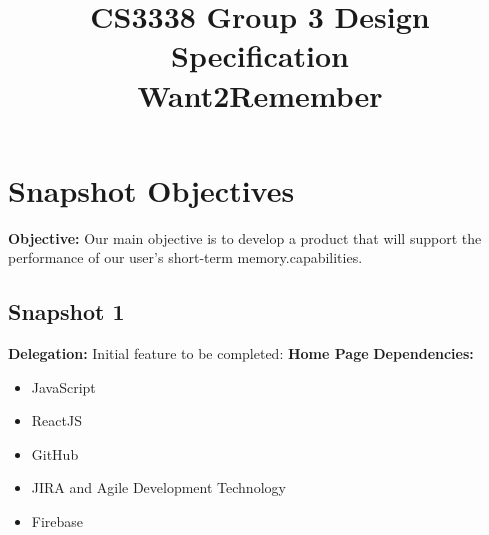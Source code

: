 \documentclass[12pt]{article}
\title{CS3338 Group 3 Design Specification\\\textbf{Want2Remember}}
\author{}
\date{}
\begin{document}
\maketitle
\thispagestyle{empty}
\newpage

\tableofcontents
\newpage

\section{Snapshot Objectives}
\textbf{Objective:} Our main objective is to develop a product that will support the performance of our user's short-term memory.capabilities.\newline
\subsection{Snapshot 1}
\textbf{Delegation:} Initial feature to be completed: \textbf{Home Page}\newline
\textbf{Dependencies:}
\begin{itemize}
    \item JavaScript
    \item ReactJS
    \item GitHub
    \item JIRA and Agile Development Technology
    \item Firebase
\end{itemize}
\end{document}

